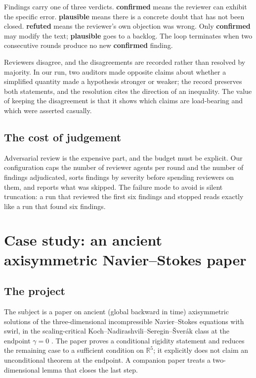 \documentclass[11pt]{article}
\newcommand{\R}{\mathbb{R}}
\begin{document}
Findings carry one of three verdicts. \textbf{confirmed} means the reviewer
can exhibit the specific error. \textbf{plausible} means there is a concrete
doubt that has not been closed. \textbf{refuted} means the reviewer's own
objection was wrong. Only \textbf{confirmed} may modify the text;
\textbf{plausible} goes to a backlog. The loop terminates when two consecutive
rounds produce no new \textbf{confirmed} finding.

Reviewers disagree, and the disagreements are recorded rather than resolved by
majority. In our run, two auditors made opposite claims about whether a
simplified quantity made a hypothesis stronger or weaker; the record preserves
both statements, and the resolution cites the direction of an inequality. The
value of keeping the disagreement is that it shows which claims are
load-bearing and which were asserted casually.

\subsection{The cost of judgement}

Adversarial review is the expensive part, and the budget must be explicit. Our
configuration caps the number of reviewer agents per round and the number of
findings adjudicated, sorts findings by severity before spending reviewers on
them, and reports what was skipped. The failure mode to avoid is silent
truncation: a run that reviewed the first six findings and stopped reads
exactly like a run that found six findings.

\section{Case study: an ancient axisymmetric Navier--Stokes paper}
\label{sec:case}

\subsection{The project}

The subject is a paper on ancient (global backward in time) axisymmetric
solutions of the three-dimensional incompressible Navier--Stokes equations with
swirl, in the scaling-critical Koch--\allowbreak Nadirashvili--\allowbreak Seregin--\allowbreak \v{S}ver\'ak class
at the endpoint $\gamma=0$ \cite{KNSS}. The paper proves a conditional rigidity
statement and reduces the remaining case to a sufficient condition on
$\R^5$; it explicitly does not claim an unconditional theorem at the endpoint.
A companion paper treats a two-dimensional lemma that closes the last step.
\end{document}
